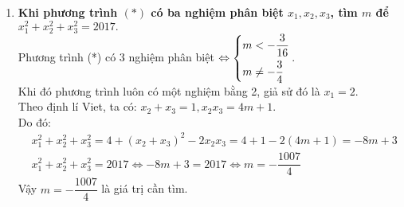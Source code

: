 \begin{ex}
{\begin{enumerate}
\item \textbf{Khi phương trình $\left(*\right)$ có ba nghiệm phân biệt $x_1,x_2,x_3$, tìm $m$ để $x_1^2+x_2^2+x_3^2=2017.$}\\
Phương trình (*) có 3 nghiệm phân biệt $\Leftrightarrow \left\{\begin{aligned}&m<-\dfrac{3}{16}\\&m\ne-\dfrac{3}{4}\end{aligned}\right.$.\\
Khi đó phương trình luôn có một nghiệm bằng 2, giả sử đó là $x_1=2$.\\
Theo định lí Viet, ta có: $x_2+x_3=1, x_2x_3=4m+1$.\\
Do đó:
\begin{align*}
&x_1^2+x_2^2+x_3^2=4+(x_2+x_3)^2-2x_2x_3=4+1-2(4m+1)=-8m+3 \\
&x_1^2+x_2^2+x_3^2=2017\Leftrightarrow-8m+3=2017\Leftrightarrow m=-\dfrac{1007}{4}
\end{align*}
Vậy $m=-\dfrac{1007}{4}$ là giá trị cần tìm.
\end{enumerate}
}
\end{ex}
